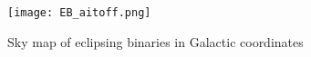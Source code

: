 \begin{comment}
Unique nss sources  813 687  \\
nss two body orbit  443 205  \\
Orbital                     134 598 \\  %
OrbitalAlternative*         629     \\
OrbitalTargetedSearch*      533     \\ 
AstroSpectroSB1             33 467  \\
SB1 or SB2                  186 905  \\  %
EclipsingSpectro            155    \\
EclipsingBinary             86 918  \\   %
\end{comment}





\begin{figure}[H]
\centering
\texttt{[image: EB\_aitoff.png]}
\caption{Sky map of eclipsing binaries in Galactic coordinates }
\label{fig:All-sky map of eclipsing binaries}
\end{figure}


